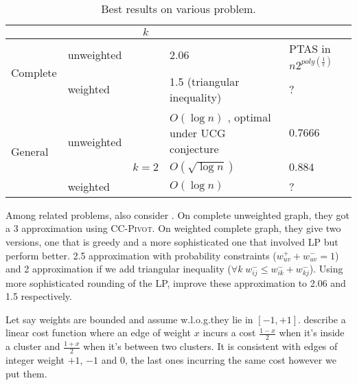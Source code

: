\begin{table}
\begin{tabularx}{\linewidth}{llcXX}
\toprule
							 &                             & $k$   & \mind{}                                                                                   & \maxa{} \\ \midrule
   \multirow{2}{*}{Complete} & unweighted                  &       & 2.06 \autocite{Chawla2014}                                                                & PTAS in $n2^{poly(\frac{1}{\epsilon})}$ \autocite{Giotis2006} \\
   \cmidrule(r){4-5}
							 & weighted                    &       & 1.5 (triangular inequality) \autocite{Chawla2014}                                         & ? \\
   \midrule
   \multirow{3}{*}{General}  & \multirow{2}{*}{unweighted} &       & $O(\log n)$ \autocite{Bansal2002}, optimal under UCG conjecture \autocite{Makarychev2014} & $0.7666$ \autocite{Swamy2004} \\
   \cmidrule(r){4-5}
							 & unweighted                  & $k=2$ & $O(\sqrt{\log n})$ \autocite{min2CNF05}                                                   & $0.884$ \autocite{Mitra2009} \\
   \cmidrule(r){4-5}
							 & weighted                    &       & $O(\log n)$ \textcite{Demaine2006}                                                        & ? \\
\bottomrule
\end{tabularx}
\caption{Best results on various problem.\label{tab:soa}}
\end{table}

Among related problems, \textcite{Ailon2008} also consider \pcc{}.
On complete unweighted graph, they got a 3 approximation using
\textsc{CC-Pivot}. On weighted complete graph, they give two versions, one
that is greedy and a more sophisticated one that involved LP but perform
better. 2.5 approximation with probability constraints ($w_{uv}^+ + w_{uv}^- =
1$) and 2 approximation if we add triangular inequality ($\forall k\;
w_{ij}^- \leq w_{ik}^- + w_{kj}^-$). Using more sophisticated rounding of the
LP, \textcite{Chawla2014} improve these approximation to 2.06 and 1.5
respectively.

Let say weights are bounded and assume w.l.o.g.\@ they lie in $[-1, +1]$.
\Textcite[Section 7]{Bansal2002} describe a linear cost function where an edge
of weight $x$ incurs a cost $\frac{1-x}{2}$ when it's inside a cluster and
$\frac{1+x}{2}$ when it's between two clusters. It is consistent with edges
of integer weight $+1$, $-1$ and $0$, the last ones incurring the same cost
however we put them.


